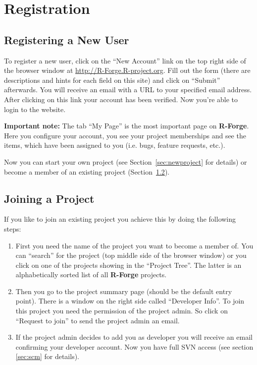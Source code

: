 \documentclass[a4paper]{article}
\begin{document}
\section{Registration}
\label{sec:registration}

\subsection{Registering a  New User}

To register a new user, click on the ``New Account'' link on the top
right side of the browser window at \url{http://R-Forge.R-project.org}.
Fill out the form (there are descriptions and hints for each field on
this site) and click on ``Submit'' afterwards. You will receive an
email with
a URL to your specified email address. After clicking on this link
your account has been verified. Now you're able to login to the
website.
\newline

\textbf{Important note:} The tab ``My Page'' is the most important
page on \textbf{R-Forge}. Here you configure your account, you see your
project memberships and see the items, which have been assigned to you
(i.e. bugs, feature requests, etc.).
\newline

Now you can start your own project (see Section~\ref{sec:newproject}
for details) or become a member of an existing project
(Section~\ref{sec:joinproject}). 

\subsection{Joining a Project}
\label{sec:joinproject}
If you like to join an existing project you achieve this by doing the
following steps:
\begin{enumerate}
\item First you need the name of the project you want to become a
  member of. You can ``search'' for the project (top middle side of the
  browser window) or you click on one of the projects showing in the
  ``Project Tree''. The latter is an alphabetically sorted list of all
  \textbf{R-Forge} projects.
\item Then you go to the project summary page (should be the default
  entry point). There is a window on the right side called
  ``Developer Info''. To join this project you need the permission of
  the project admin. So click on ``Request to join'' to send the
  project admin an email.
\item If the project admin decides to add you as developer you will
  receive an email confirming your developer account. Now you have
  full SVN access (see section \ref{sec:scm} for details).
\end{enumerate}
\end{document}
